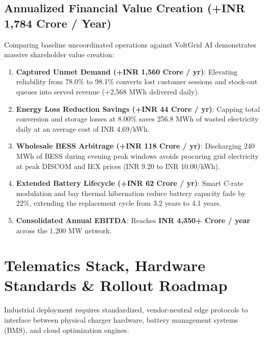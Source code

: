 \documentclass[10.5pt,a4paper]{article}
\begin{document}
\subsection{Annualized Financial Value Creation (+INR 1,784 Crore / Year)}
Comparing baseline uncoordinated operations against VoltGrid AI demonstrates massive shareholder value creation:
\begin{enumerate}
    \item \textbf{Captured Unmet Demand (+INR 1,560 Crore / yr)}: Elevating reliability from 78.0\% to 98.1\% converts lost customer sessions and stock-out queues into served revenue (+2,568 MWh delivered daily).
    \item \textbf{Energy Loss Reduction Savings (+INR 44 Crore / yr)}: Capping total conversion and storage losses at 8.00\% saves 256.8 MWh of wasted electricity daily at an average cost of INR 4.69/kWh.
    \item \textbf{Wholesale BESS Arbitrage (+INR 118 Crore / yr)}: Discharging 240 MWh of BESS during evening peak windows avoids procuring grid electricity at peak DISCOM and IEX prices (INR 9.20 to INR 10.00/kWh).
    \item \textbf{Extended Battery Lifecycle (+INR 62 Crore / yr)}: Smart $C$-rate modulation and bay thermal hibernation reduce battery capacity fade by 22\%, extending the replacement cycle from 3.2 years to 4.1 years.
    \item \textbf{Consolidated Annual EBITDA}: Reaches \textbf{INR 4,350+ Crore / year} across the 1,200 MW network.
\end{enumerate}

\section{Telematics Stack, Hardware Standards \& Rollout Roadmap}

Industrial deployment requires standardized, vendor-neutral edge protocols to interface between physical charger hardware, battery management systems (BMS), and cloud optimization engines.
\end{document}
